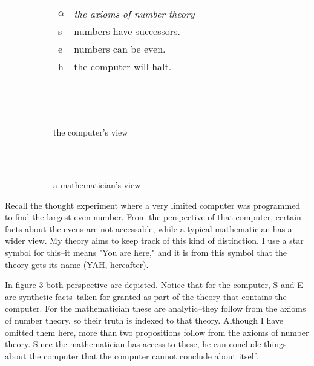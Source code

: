 \documentclass[12pt]{article}
\begin{document}
\begin{flushleft}
\begin{figure}[h]
    \centering
    \begin{subfigure}{\linewidth}
        \centering
        \begin{tabular}{l|l}
            \hline
            $\alpha$ & \textit{the axioms of number theory}\\
            s & numbers have successors.\\
            e & numbers can be even.\\
            h & the computer will halt.\\
            \hline
        \end{tabular}
    \end{subfigure}\\
    \par\bigskip
    \begin{subfigure}{.5\linewidth}
        \hspace*{7em}%
        \fitchprf
        {
             \\
        }
        {
            \pline{\bigstar}
        }
        \caption{the computer's view}
        \label{computer}
    \end{subfigure}%
    \begin{subfigure}{.5\linewidth}
        \centering
        \fitchctx
        {
            \pline{\bigstar}\\
            \subproof
            {
                \pline{\mathnormal{\alpha}}
            }
            {
                 \\
            }
        }
        \caption{a mathematician's view}
        \label{mathematician}
    \end{subfigure}
    \caption{}
    \label{even}
\end{figure}

Recall the thought experiment where a very limited computer was programmed to find the largest even number.
From the perspective of that computer, certain facts about the evens are not accessable, while a typical mathematician has a wider view.
My theory aims to keep track of this kind of distinction.
I use a star symbol for this--it means "You are here," and it is from this symbol that the theory gets its name (YAH, hereafter).

In figure \ref{even} both perspective are depicted.
Notice that for the computer, S and E are synthetic facts--taken for granted as part of the theory that contains the computer.
For the mathematician these are analytic--they follow from the axioms of number theory, so their truth is indexed to that theory.
Although I have omitted them here, more than two propositions follow from the axioms of number theory.
Since the mathematician has access to these, he can conclude things about the computer that the computer cannot conclude about itself.


\end{flushleft}
\end{document}
